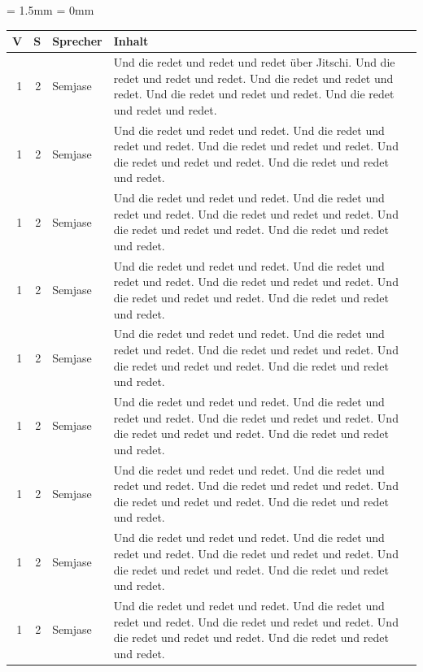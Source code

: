 \documentclass[ngerman,10pt]{book}
\begin{document}
\tabulinesep = 1.5mm
\extrarowsep = 0mm
\begin{longtabu} to \linewidth {rrlX}


\rowfont\bfseries V & S & Sprecher & Inhalt \\ \hline 
\endhead

\hline
\endfoot

\hline
\endlastfoot

1 & 2 & Semjase & Und die redet und redet und redet über Jitschi. Und die redet und redet und redet. Und die redet und redet und redet. Und die redet und redet und redet. Und die redet und redet und redet. \\
1 & 2 & Semjase & Und die redet und redet und redet. Und die redet und redet und redet. Und die redet und redet und redet. Und die redet und redet und redet. Und die redet und redet und redet. \\
1 & 2 & Semjase & Und die redet und redet und redet. Und die redet und redet und redet. Und die redet und redet und redet. Und die redet und redet und redet. Und die redet und redet und redet. \\
1 & 2 & Semjase & Und die redet und redet und redet. Und die redet und redet und redet. Und die redet und redet und redet. Und die redet und redet und redet. Und die redet und redet und redet. \\
1 & 2 & Semjase & Und die redet und redet und redet. Und die redet und redet und redet. Und die redet und redet und redet. Und die redet und redet und redet. Und die redet und redet und redet. \\
1 & 2 & Semjase & Und die redet und redet und redet. Und die redet und redet und redet. Und die redet und redet und redet. Und die redet und redet und redet. Und die redet und redet und redet. \\
1 & 2 & Semjase & Und die redet und redet und redet. Und die redet und redet und redet. Und die redet und redet und redet. Und die redet und redet und redet. Und die redet und redet und redet. \\
1 & 2 & Semjase & Und die redet und redet und redet. Und die redet und redet und redet. Und die redet und redet und redet. Und die redet und redet und redet. Und die redet und redet und redet. \\
1 & 2 & Semjase & Und die redet und redet und redet. Und die redet und redet und redet. Und die redet und redet und redet. Und die redet und redet und redet. Und die redet und redet und redet. \\

\end{longtabu}
\end{document}
